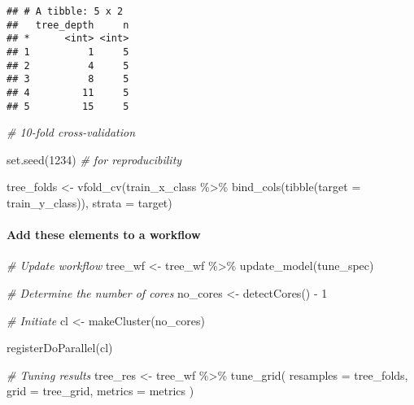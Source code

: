 \documentclass[
]{book}
\newenvironment{Shaded}{\begin{snugshade}}{\end{snugshade}}
\newcommand{\AttributeTok}[1]{\textcolor[rgb]{0.77,0.63,0.00}{#1}}
\newcommand{\CommentTok}[1]{\textcolor[rgb]{0.56,0.35,0.01}{\textit{#1}}}
\newcommand{\DecValTok}[1]{\textcolor[rgb]{0.00,0.00,0.81}{#1}}
\newcommand{\FunctionTok}[1]{\textcolor[rgb]{0.00,0.00,0.00}{#1}}
\newcommand{\NormalTok}[1]{#1}
\newcommand{\OtherTok}[1]{\textcolor[rgb]{0.56,0.35,0.01}{#1}}
\newcommand{\SpecialCharTok}[1]{\textcolor[rgb]{0.00,0.00,0.00}{#1}}
\begin{document}
\begin{verbatim}
## # A tibble: 5 x 2
##   tree_depth     n
## *      <int> <int>
## 1          1     5
## 2          4     5
## 3          8     5
## 4         11     5
## 5         15     5
\end{verbatim}

\begin{Shaded}
\begin{Highlighting}[]
\CommentTok{\# 10{-}fold cross{-}validation}

\FunctionTok{set.seed}\NormalTok{(}\DecValTok{1234}\NormalTok{) }\CommentTok{\# for reproducibility }

\NormalTok{tree\_folds }\OtherTok{\textless{}{-}} \FunctionTok{vfold\_cv}\NormalTok{(train\_x\_class }\SpecialCharTok{\%\textgreater{}\%} \FunctionTok{bind\_cols}\NormalTok{(}\FunctionTok{tibble}\NormalTok{(}\AttributeTok{target =}\NormalTok{ train\_y\_class)),}
                       \AttributeTok{strata =}\NormalTok{ target)}
\end{Highlighting}
\end{Shaded}

\hypertarget{add-these-elements-to-a-workflow-1}{%
\paragraph{Add these elements to a workflow}\label{add-these-elements-to-a-workflow-1}}

\begin{Shaded}
\begin{Highlighting}[]
\CommentTok{\# Update workflow }
\NormalTok{tree\_wf }\OtherTok{\textless{}{-}}\NormalTok{ tree\_wf }\SpecialCharTok{\%\textgreater{}\%} \FunctionTok{update\_model}\NormalTok{(tune\_spec)}

\CommentTok{\# Determine the number of cores}
\NormalTok{no\_cores }\OtherTok{\textless{}{-}} \FunctionTok{detectCores}\NormalTok{() }\SpecialCharTok{{-}} \DecValTok{1}

\CommentTok{\# Initiate}
\NormalTok{cl }\OtherTok{\textless{}{-}} \FunctionTok{makeCluster}\NormalTok{(no\_cores)}

\FunctionTok{registerDoParallel}\NormalTok{(cl)}

\CommentTok{\# Tuning results }
\NormalTok{tree\_res }\OtherTok{\textless{}{-}}\NormalTok{ tree\_wf }\SpecialCharTok{\%\textgreater{}\%}
  \FunctionTok{tune\_grid}\NormalTok{(}
    \AttributeTok{resamples =}\NormalTok{ tree\_folds, }
    \AttributeTok{grid =}\NormalTok{ tree\_grid,}
    \AttributeTok{metrics =}\NormalTok{ metrics}
\NormalTok{  )}
\end{Highlighting}
\end{Shaded}
\end{document}
